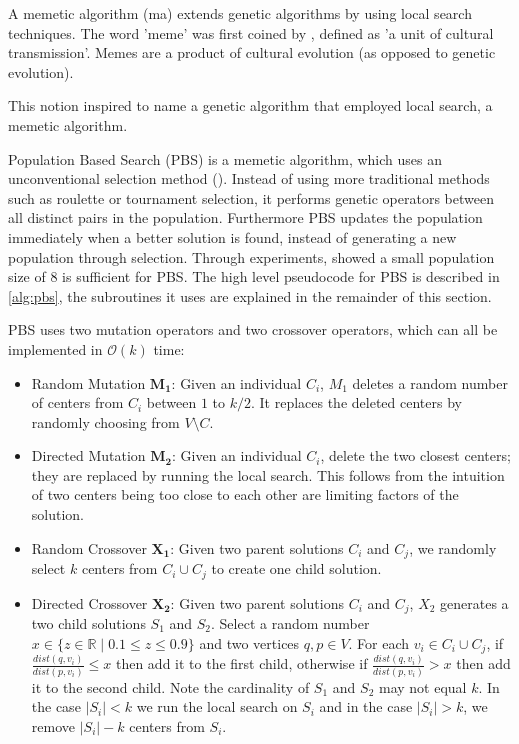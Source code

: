 A memetic algorithm (\acrshort{ma}) extends genetic algorithms by using local search techniques. The word 'meme' was first coined by \textcite{dawkins_selfish_1976}, defined as 'a unit of cultural transmission'. Memes are a product of cultural evolution (as opposed to genetic evolution).



This notion inspired \textcite{moscato_evolution_1989} to name a genetic algorithm that employed local search, a memetic algorithm.

Population Based Search (PBS) is a memetic algorithm, which uses an unconventional selection method (\cite{pullan_memetic_2008}). Instead of using more traditional methods such as roulette or tournament selection, it performs genetic operators between all distinct pairs in the population. Furthermore PBS updates the population immediately when a better solution is found, instead of generating a new population through selection. Through experiments, \citeauthor{pullan_memetic_2008} showed a small population size of 8 is sufficient for PBS. The high level pseudocode for PBS is described in \cref{alg:pbs}, the subroutines it uses are explained in the remainder of this section.

PBS uses two mutation operators and two crossover operators, which can all be implemented in $\mathcal{O}(k)$ time:
\begin{itemize}
    \item Random Mutation $\mathbf{M_1}$: Given an individual $C_i$, $M_1$ deletes a random number of centers from $C_i$ between $1$ to $k/2$. It replaces the deleted centers by randomly choosing from $V\setminus C$.
    \item Directed Mutation $\mathbf{M_2}$: Given an individual $C_i$, delete the two closest centers; they are replaced by running the local search. This follows from the intuition of two centers being too close to each other are limiting factors of the solution. 
    \item Random Crossover $\mathbf{X_1}$: Given two parent solutions $C_i$ and $C_j$, we randomly select $k$ centers from $C_i\cup C_j$ to create one child solution.
    \item Directed Crossover $\mathbf{X_2}$: Given two parent solutions $C_i$ and $C_j$, $X_2$ generates a two child solutions $S_1$ and $S_2$. Select a random number $x\in\{z\in\mathbb{R}\mid 0.1\leq z\leq 0.9\}$ and two vertices $q,p\in V$. For each $v_i\in C_i\cup C_j$, if $\frac{dist(q, v_i)}{dist(p, v_i)}\leq x$ then add it to the first child, otherwise if $\frac{dist(q, v_i)}{dist(p, v_i)}>x$ then add it to the second child. Note the cardinality of $S_1$ and $S_2$ may not equal $k$. In the case $|S_i|<k$ we run the local search on $S_i$ and in the case $|S_i|>k$, we remove $|S_i|-k$ centers from $S_i$.
\end{itemize}

